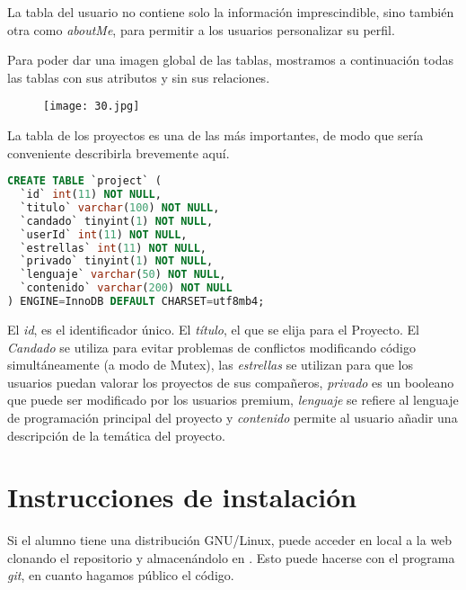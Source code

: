 \documentclass[12pt]{report}
\begin{document}
La tabla del usuario no contiene solo la información imprescindible, sino también otra como \textit{aboutMe}, para permitir a los usuarios personalizar su perfil.

Para poder dar una imagen global de las tablas, mostramos a continuación todas las tablas con sus atributos y sin sus relaciones.

\begin{figure}[!h]
 \centering
  \texttt{[image: 30.jpg]}
\end{figure}

La tabla de los proyectos es una de las más importantes, de modo que sería conveniente describirla brevemente aquí.

\begin{lstlisting}[language=SQL]
CREATE TABLE `project` (
  `id` int(11) NOT NULL,
  `titulo` varchar(100) NOT NULL,
  `candado` tinyint(1) NOT NULL,
  `userId` int(11) NOT NULL,
  `estrellas` int(11) NOT NULL,
  `privado` tinyint(1) NOT NULL,
  `lenguaje` varchar(50) NOT NULL,
  `contenido` varchar(200) NOT NULL
) ENGINE=InnoDB DEFAULT CHARSET=utf8mb4;

\end{lstlisting}

El \textit{id}, es el identificador único. El \textit{título}, el que se elija para el Proyecto. El \textit{Candado} se utiliza para evitar problemas de conflictos modificando código simultáneamente (a modo de Mutex), las \textit{estrellas} se utilizan para que los usuarios puedan valorar los proyectos de sus compañeros, \textit{privado} es un booleano que puede ser modificado por los usuarios premium, \textit{lenguaje} se refiere al lenguaje de programación principal del proyecto y \textit{contenido} permite al usuario añadir una descripción de la temática del proyecto.


\section{Instrucciones de instalación}

Si el alumno tiene una distribución GNU/Linux, puede acceder en local a la web clonando el repositorio y almacenándolo en . Esto puede hacerse con el programa \textit{git}, en cuanto hagamos público el código.
\newline
\end{document}

